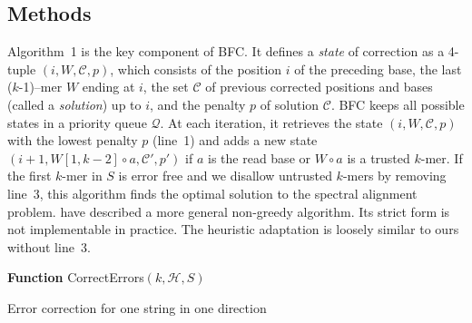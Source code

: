 \documentclass{bioinfo}
\begin{document}
\begin{methods}
\section{Methods}
Algorithm~1 is the key component of BFC. It defines a \emph{state}
of correction as a 4-tuple $(i,W,\mathcal{C},p)$, which consists of the
position $i$ of the preceding base, the last \mbox{($k$-1)--mer} $W$ ending at
$i$, the set $\mathcal{C}$ of previous corrected positions and bases (called a
\emph{solution}) up to $i$, and the penalty $p$ of solution $\mathcal{C}$. BFC
keeps all possible states in a priority queue $\mathcal{Q}$. At each iteration,
it retrieves the state $(i,W,\mathcal{C},p)$ with the lowest penalty $p$ (line~1) and
adds a new state $(i+1,W[1,k-2]\circ a,\mathcal{C}',p')$ if $a$ is the read
base or $W\circ a$ is a trusted $k$-mer. If the first $k$-mer in $S$ is
error free and we disallow untrusted $k$-mers by removing line~3, this
algorithm finds the optimal solution to the spectral alignment problem.
\citet{Chaisson:2004kx} have described a more general non-greedy algorithm.
Its strict form is not implementable in practice. The heuristic adaptation
is loosely similar to ours without line~3.

\begin{algorithm}[ht]
\DontPrintSemicolon
\footnotesize
{}
\BlankLine
\textbf{Function} {\sc CorrectErrors}$(k, \mathcal{H}, S)$
\caption{Error correction for one string in one direction}
\end{algorithm}


\end{methods}
\end{document}
